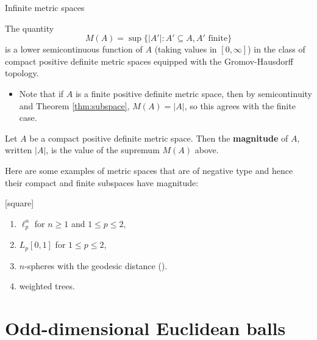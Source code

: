 \documentclass[12pt,mathserif]{beamer}
\begin{document}
\begin{frame}[allowframebreaks]{Infinite metric spaces}
\framebreak

\begin{theorem}
The quantity
\begin{equation*}
M(A) = \sup\{\vert A'\vert : A' \subseteq A, \text{$A'$ finite}\}
\end{equation*}
is a lower semicontinuous function of $A$ (taking values in $[0,\infty]$) in the class of compact positive definite metric spaces equipped with the Gromov-Hausdorff topology.
\end{theorem}

\begin{itemize}
\item Note that if $A$ is a finite positive definite metric space, then by semicontinuity and Theorem \ref{thm:subspace}, $M(A) = \vert A \vert$, so this agrees with the finite case.
\end{itemize}

\framebreak

\begin{definition}
Let $A$ be a compact positive definite metric space. Then the \textbf{magnitude} of $A$, written $\vert A \vert$, is the value of the supremum $M(A)$ above.
\end{definition}

\framebreak

Here are some examples of metric spaces that are of negative type and hence their compact and finite subspaces have magnitude:

\begin{example}
[square]
\begin{enumerate}
\item $\ell_p^n$ for $n \geq 1$ and $1\leq p \leq 2$,
\item $L_p[0,1]$ for $1 \leq p \leq 2$,
\item $n$-spheres with the geodesic distance (\cite{willerton_magnitude_2014}).
\item weighted trees.
\end{enumerate}
\end{example}

\end{frame}

\section{Odd-dimensional Euclidean balls}
\end{document}
